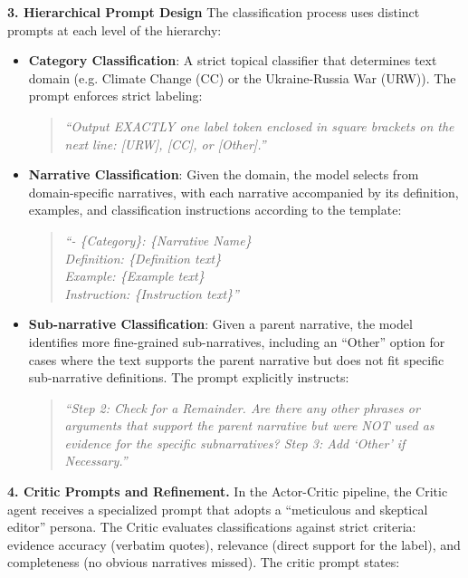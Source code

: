 \noindent\textbf{3. Hierarchical Prompt Design} 
The classification process uses distinct prompts at each level of the hierarchy:
\begin{itemize}
\item \textbf{Category Classification}: A strict topical classifier that determines text domain (e.g. Climate Change (CC) or the Ukraine-Russia War (URW)). 
The prompt enforces strict labeling: 
\begin{quote}
\small
\textit{``Output EXACTLY one label token enclosed in square brackets on the next line: [URW], [CC], or [Other].''}
\end{quote}

\item \textbf{Narrative Classification}: Given the domain, the model selects from domain-specific narratives, with each narrative accompanied by its definition, examples, and classification instructions according to the template:
\begin{quote}
\small
\textit{``- \{Category\}: \{Narrative Name\}\\
\hspace*{1em}Definition: \{Definition text\}\\
\hspace*{1em}Example: \{Example text\}\\
\hspace*{1em}Instruction: \{Instruction text\}''}
\end{quote}

\item \textbf{Sub-narrative Classification}: Given a parent narrative, the model identifies more fine-grained sub-narratives, including an ``Other'' option for cases where the text supports the parent narrative but does not fit specific sub-narrative definitions. The prompt explicitly instructs: 
\begin{quote}
\small
\textit{``Step 2: Check for a Remainder. Are there any other phrases or arguments that support the parent narrative but were NOT used as evidence for the specific subnarratives? Step 3: Add `Other' if Necessary.''}
\end{quote}
\end{itemize}

\noindent\textbf{4. Critic Prompts and Refinement.} 
In the Actor-Critic pipeline, the Critic agent receives a specialized prompt that adopts a ``meticulous and skeptical editor'' persona. The Critic evaluates classifications against strict criteria: evidence accuracy (verbatim quotes), relevance (direct support for the label), and completeness (no obvious narratives missed). The critic prompt states:

